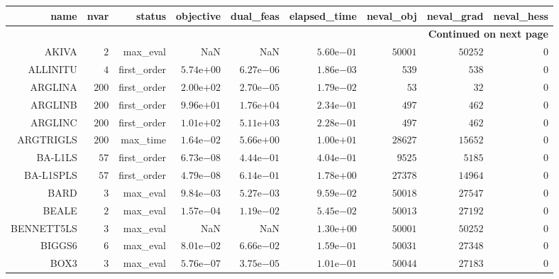 \begin{longtable}{rrrrrrrrr}
\hline
name & nvar & status & objective & dual\_feas & elapsed\_time & neval\_obj & neval\_grad & neval\_hess \\\hline
\endhead
\hline
\multicolumn{9}{r}{{\bfseries Continued on next page}}\\
\hline
\endfoot
\endlastfoot
AKIVA & \(     2\) & max\_eval &       NaN &       NaN & \( 5.60\)e\(-01\) & \( 50001\) & \( 50252\) & \(     0\) \\
ALLINITU & \(     4\) & first\_order & \( 5.74\)e\(+00\) & \( 6.27\)e\(-06\) & \( 1.86\)e\(-03\) & \(   539\) & \(   538\) & \(     0\) \\
ARGLINA & \(   200\) & first\_order & \( 2.00\)e\(+02\) & \( 2.70\)e\(-05\) & \( 1.79\)e\(-02\) & \(    53\) & \(    32\) & \(     0\) \\
ARGLINB & \(   200\) & first\_order & \( 9.96\)e\(+01\) & \( 1.76\)e\(+04\) & \( 2.34\)e\(-01\) & \(   497\) & \(   462\) & \(     0\) \\
ARGLINC & \(   200\) & first\_order & \( 1.01\)e\(+02\) & \( 5.11\)e\(+03\) & \( 2.28\)e\(-01\) & \(   497\) & \(   462\) & \(     0\) \\
ARGTRIGLS & \(   200\) & max\_time & \( 1.64\)e\(-02\) & \( 5.66\)e\(+00\) & \( 1.00\)e\(+01\) & \( 28627\) & \( 15652\) & \(     0\) \\
BA-L1LS & \(    57\) & first\_order & \( 6.73\)e\(-08\) & \( 4.44\)e\(-01\) & \( 4.04\)e\(-01\) & \(  9525\) & \(  5185\) & \(     0\) \\
BA-L1SPLS & \(    57\) & first\_order & \( 4.79\)e\(-08\) & \( 6.14\)e\(-01\) & \( 1.78\)e\(+00\) & \( 27378\) & \( 14964\) & \(     0\) \\
BARD & \(     3\) & max\_eval & \( 9.84\)e\(-03\) & \( 5.27\)e\(-03\) & \( 9.59\)e\(-02\) & \( 50018\) & \( 27547\) & \(     0\) \\
BEALE & \(     2\) & max\_eval & \( 1.57\)e\(-04\) & \( 1.19\)e\(-02\) & \( 5.45\)e\(-02\) & \( 50013\) & \( 27192\) & \(     0\) \\
BENNETT5LS & \(     3\) & max\_eval &       NaN &       NaN & \( 1.30\)e\(+00\) & \( 50001\) & \( 50252\) & \(     0\) \\
BIGGS6 & \(     6\) & max\_eval & \( 8.01\)e\(-02\) & \( 6.66\)e\(-02\) & \( 1.59\)e\(-01\) & \( 50031\) & \( 27348\) & \(     0\) \\
BOX3 & \(     3\) & max\_eval & \( 5.76\)e\(-07\) & \( 3.75\)e\(-05\) & \( 1.01\)e\(-01\) & \( 50044\) & \( 27183\) & \(     0\) \\

\end{longtable}
